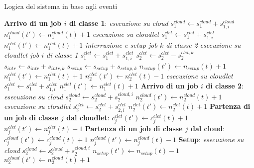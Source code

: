 \begin{algorithm}[!h]
\centering
\caption{Logica del sistema in base agli eventi}
\label{alg}
\begin{algorithmic}
\STATE \textbf{Arrivo di un job $i$ di classe 1}:
\STATE \emph{esecuzione su cloud}
\STATE $s_1^{cloud} \leftarrow s_1^{cloud} + s_{1,i}^{cloud}$
\STATE $n_1^{cloud}(t') \leftarrow n_1^{cloud}(t) + 1$
\STATE \emph{esecuzione su cloudlet}
\STATE $s_1^{clet} \leftarrow s_1^{clet} + s_{1,i}^{clet}$
\STATE $n_1^{clet}(t') \leftarrow n_1^{clet}(t) + 1$
\STATE \emph{interruzione e setup job $k$ di classe 2}
\STATE \emph{esecuzione su cloudlet job $i$ di classe 1}
\STATE $s_1^{clet} \leftarrow s_1^{clet} + s_{1,i}^{clet}$
\STATE $s_2^{clet} \leftarrow s_2^{clet} - s_2^{clet,k}$
\STATE $s_{intr} \leftarrow s_{intr} + s_{intr,k}$
\STATE $s_{setup} \leftarrow s_{setup} + s_{setup,k}$
\STATE $n_{setup}(t') \leftarrow n_{setup}(t) + 1$
\STATE $n_1^{clet}(t') \leftarrow n_1^{clet}(t) + 1$
\STATE $n_2^{clet}(t') \leftarrow n_2^{clet}(t) - 1$
\ELSE
\STATE \emph{esecuzione su cloudlet}
\STATE $s_1^{clet} \leftarrow s_1^{clet} + s_{1,i}^{clet}$
\STATE $n_1^{clet}(t') \leftarrow n_1^{clet}(t) + 1$
\ENDIF
\STATE \textbf{Arrivo di un job $i$ di classe 2}:
\STATE \emph{esecuzione su cloud}
\STATE $s_2^{cloud} \leftarrow s_2^{cloud} + s_2^{cloud,i}$
\STATE $n_2^{cloud}(t') \leftarrow n_2^{cloud}(t) + 1$
\ELSE
\STATE \emph{esecuzione su cloudlet}
\STATE $s_2^{clet} \leftarrow s_2^{clet} + s_{2,i}^{clet}$
\STATE $n_2^{clet}(t') \leftarrow n_2^{clet}(t) + 1$
\ENDIF
\STATE \textbf{Partenza di un job di classe $j$ dal cloudlet}:
\STATE $c_j^{clet}(t') \leftarrow c_j^{clet}(t) + 1$
\STATE $n_j^{clet}(t') \leftarrow n_j^{clet}(t) - 1$
\STATE \textbf{Partenza di un job di classe $j$ dal cloud}:
\STATE $c_j^{cloud}(t') \leftarrow c_j^{cloud}(t) + 1$
\STATE $n_j^{cloud}(t') \leftarrow n_j^{cloud}(t) - 1$
\STATE \textbf{Setup}:
\STATE \emph{esecuzione su cloud}
\STATE $s_2^{cloud} \leftarrow s_2^{cloud} + s_2^{cloud,i}$
\STATE $n_{setup}(t') \leftarrow n_{setup}(t) - 1$
\STATE $n_2^{cloud}(t') \leftarrow n_2^{cloud}(t) + 1$
\end{algorithmic}
\end{algorithm}
%
%
